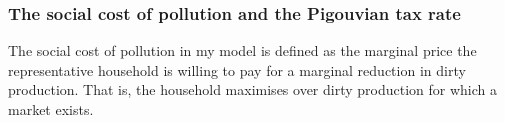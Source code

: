 \begin{comment}
content...
\paragraph{If a reduction in dirty labor share is efficient, then the aggregate production function features decreasing returns to scale in labor}
\begin{proof}
	\textit{The proof rest on the assumption that returns to scale are symmetric across dirty and clean production; either both decreasing or both are non-decreasing.}
It holds by assumption that $s_{FB,E>0}<s_{FB,E=0}$, where $E>0$ indicates that the externality is active. 
Assume by contradiction that the aggregate production function features non-decreasing returns to scale. This implies that:
\begin{align}
\left. \frp{Y}{L_F} \right|_{s_{FB,E>0}}\leq \left. \frp{Y}{L_F} \right|_{s_{FB,E=0}},\\
\left. \frp{Y}{L_G} \right|_{s_{FB,E>0}}\geq \left. \frp{Y}{L_G} \right|_{s_{FB,E=0}}.
\end{align}
When there is no externality, the efficient allocation is characterized by
\begin{align}
\left. \frp{Y}{L_F} \right|_{s_{FB,E=0}}= \left. \frp{Y}{L_G} \right|_{s_{FB,E=0}}.
\end{align}
Using the inequalities above yields
\begin{align}
\left. \frp{Y}{L_F} \right|_{s_{FB,E>0}}\leq \left. \frp{Y}{L_G} \right|_{s_{FB,E>0}}.
\end{align}
This contradicts the optimality condition which requires 
\begin{align}
\left. \frp{Y}{L_F} \right|_{s_{FB,E>0}}> \left. \frp{Y}{L_G} \right|_{s_{FB,E>0}}.
\end{align}
Hence, when a reduction in the dirty labor share is efficient, then the aggregate production function features decreasing returns to scale in both labor input goods. 
\end{proof}
\end{comment}

\subsubsection{The social cost of pollution and the Pigouvian tax rate}\label{app:scp}

The social cost of pollution in my model is defined as the marginal price the representative household is willing to pay for a marginal reduction in dirty production. That is, the household maximises over dirty production for which a market exists.

